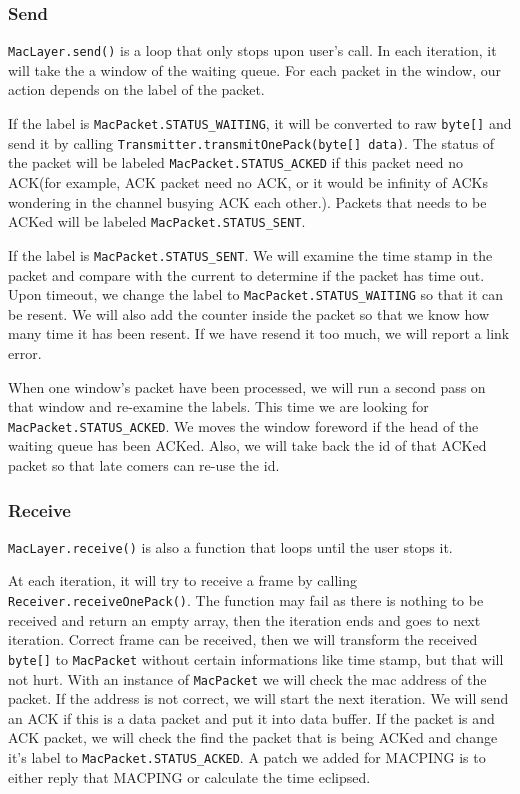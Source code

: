 \documentclass[conference,compsoc]{IEEEtran}
\begin{document}
		\subsubsection{Send}
			\lstinline{MacLayer.send()} is a loop that only stops upon user's call.
			In each iteration, it will take the a window of the waiting queue. For each packet in the window, our action depends on the label of the packet.
			\par
			If the label is \lstinline{MacPacket.STATUS_WAITING}, it will be converted to raw \lstinline{byte[]} and send it by calling \lstinline{Transmitter.transmitOnePack(byte[] data)}. The status of the packet will be labeled \lstinline{MacPacket.STATUS_ACKED} if this packet need no ACK(for example, ACK packet need no ACK, or it would be infinity of ACKs wondering in the channel busying ACK each other.). Packets that needs to be ACKed will be labeled \lstinline{MacPacket.STATUS_SENT}.
			\par 
			If the label is \lstinline{MacPacket.STATUS_SENT}. 
			We will examine the time stamp in the packet and compare with the current to determine if the packet has time out. Upon timeout, we change the label to \lstinline{MacPacket.STATUS_WAITING} so that it can be resent. 
			We will also add the counter inside the packet so that we know how many time it has been resent. 
			If we have resend it too much, we will report a link error.
			\par
			When one window's packet have been processed, we will run a second pass on that window and re-examine the labels. 
			This time we are looking for \lstinline{MacPacket.STATUS_ACKED}. 
			We moves the window foreword if the head of the waiting queue has been ACKed. 
			Also, we will take back the id of that ACKed packet so that late comers can re-use the id.

		\subsubsection{Receive}
			\lstinline{MacLayer.receive()} is also a function that loops until the user stops it.
			\par
			At each iteration, it will try to receive a frame by calling \lstinline{Receiver.receiveOnePack()}.
			The function may fail as there is nothing to be received and return an empty array, then the iteration ends and goes to next iteration.
			Correct frame can be received, then we will transform the received \lstinline{byte[]} to \lstinline{MacPacket} without certain informations like time stamp, but that will not hurt.
			With an instance of \lstinline{MacPacket} we will check the mac address of the packet. 
			If the address is not correct, we will start the next iteration. 
			We will send an ACK if this is a data packet and put it into data buffer. 
			If the packet is and ACK packet, we will check the find the packet that is being ACKed and change it's label to \lstinline{MacPacket.STATUS_ACKED}.
			A patch we added for MACPING is to either reply that MACPING or calculate the time eclipsed.
\end{document}
